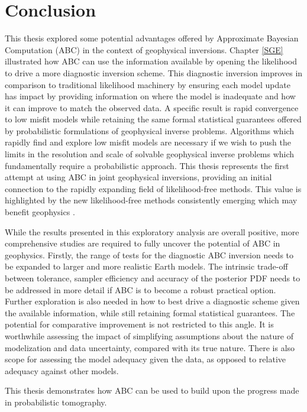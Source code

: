 

\chapter{Conclusion}

This thesis explored some potential advantages offered by Approximate Bayesian Computation (ABC) in the context of geophysical inversions. Chapter \ref{SGE} illustrated how ABC can use the information available by opening the likelihood to drive a more diagnostic inversion scheme. This diagnostic inversion improves in comparison to traditional likelihood machinery by ensuring each model update has impact by providing information on where the model is inadequate and how it can improve to match the observed data. A specific result is rapid convergence to low misfit models while retaining the same formal statistical guarantees offered by probabilistic formulations of geophysical inverse problems. Algorithms which rapidly find and explore low misfit models are necessary if we wish to push the limits in the resolution and scale of solvable geophysical inverse problems which fundamentally require a probabilistic approach. This thesis represents the first attempt at using ABC in joint geophysical inversions, providing an initial connection to the rapidly expanding field of likelihood-free methods. This value is highlighted by the new likelihood-free methods consistently emerging which may benefit geophysics \citep{papamakarios2016fast,song2017nice}.\par

While the results presented in this exploratory analysis are overall positive, more comprehensive studies are required to fully uncover the potential of ABC in geophysics. Firstly, the range of tests for the diagnostic ABC inversion needs to be expanded to larger and more realistic Earth models. The intrinsic trade-off between tolerance, sampler efficiency and accuracy of the posterior PDF needs to be addressed in more detail if ABC is to become a robust practical option. Further exploration is also needed in how to best drive a diagnostic scheme given the available information, while still retaining formal statistical guarantees. The potential for comparative improvement is not restricted to this angle. It is worthwhile assessing the impact of simplifying assumptions about the nature of modelization and data uncertainty, compared with its true nature. There is also scope for assessing the model adequacy given the data, as opposed to relative adequacy against other models. \par

This thesis demonstrates how ABC can be used to build upon the progress made in probabilistic tomography.
